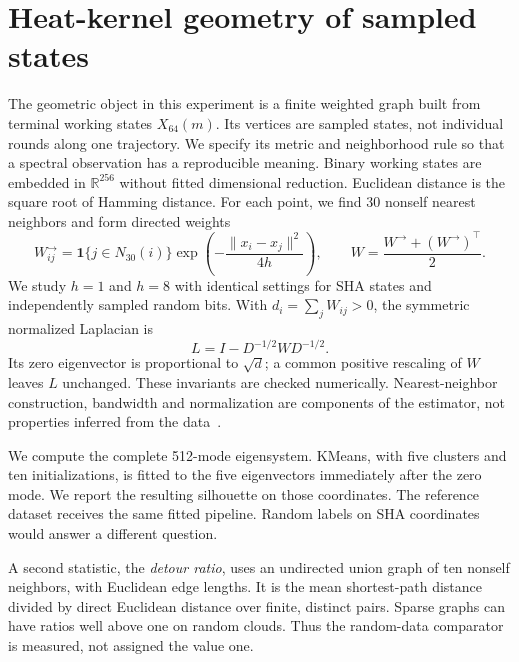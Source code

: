\documentclass[11pt]{article}
\begin{document}
\section{Heat-kernel geometry of sampled states}
The geometric object in this experiment is a finite weighted graph built from terminal working states $X_{64}(m)$. Its vertices are sampled states, not individual rounds along one trajectory. We specify its metric and neighborhood rule so that a spectral observation has a reproducible meaning.
Binary working states are embedded in $\mathbb R^{256}$ without fitted dimensional reduction. Euclidean distance is the square root of Hamming distance. For each point, we find 30 nonself nearest neighbors and form directed weights
\begin{equation}
 W^{\rightarrow}_{ij}=\mathbf 1\{j\in N_{30}(i)\}
 \exp\!\left(-\frac{\|x_i-x_j\|^2}{4h}\right),\qquad
 W=\frac{W^{\rightarrow}+(W^{\rightarrow})^\top}{2}.
\end{equation}
We study $h=1$ and $h=8$ with identical settings for SHA states and independently sampled random bits. With $d_i=\sum_jW_{ij}>0$, the symmetric normalized Laplacian is
\begin{equation}L=I-D^{-1/2}WD^{-1/2}.\end{equation}
Its zero eigenvector is proportional to $\sqrt d$; a common positive rescaling of $W$ leaves $L$ unchanged. These invariants are checked numerically. Nearest-neighbor construction, bandwidth and normalization are components of the estimator, not properties inferred from the data~\cite{luxburg}.

We compute the complete 512-mode eigensystem. KMeans, with five clusters and ten initializations, is fitted to the five eigenvectors immediately after the zero mode. We report the resulting silhouette on those coordinates. The reference dataset receives the same fitted pipeline. Random labels on SHA coordinates would answer a different question.

A second statistic, the \emph{detour ratio}, uses an undirected union graph of ten nonself neighbors, with Euclidean edge lengths. It is the mean shortest-path distance divided by direct Euclidean distance over finite, distinct pairs. Sparse graphs can have ratios well above one on random clouds. Thus the random-data comparator is measured, not assigned the value one.
\end{document}
